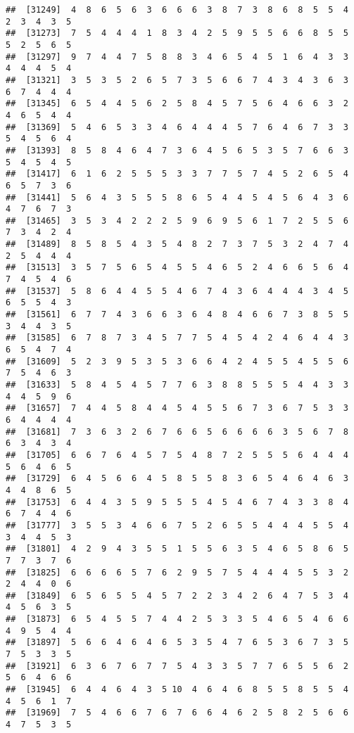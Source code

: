 \documentclass[
]{book}
\begin{document}
\begin{verbatim}
##  [31249]  4  8  6  5  6  3  6  6  6  3  8  7  3  8  6  8  5  5  4  2  3  4  3  5
##  [31273]  7  5  4  4  4  1  8  3  4  2  5  9  5  5  6  6  8  5  5  5  2  5  6  5
##  [31297]  9  7  4  4  7  5  8  8  3  4  6  5  4  5  1  6  4  3  3  4  4  4  5  4
##  [31321]  3  5  3  5  2  6  5  7  3  5  6  6  7  4  3  4  3  6  3  6  7  4  4  4
##  [31345]  6  5  4  4  5  6  2  5  8  4  5  7  5  6  4  6  6  3  2  4  6  5  4  4
##  [31369]  5  4  6  5  3  3  4  6  4  4  4  5  7  6  4  6  7  3  3  5  4  5  6  4
##  [31393]  8  5  8  4  6  4  7  3  6  4  5  6  5  3  5  7  6  6  3  5  4  5  4  5
##  [31417]  6  1  6  2  5  5  5  3  3  7  7  5  7  4  5  2  6  5  4  6  5  7  3  6
##  [31441]  5  6  4  3  5  5  5  8  6  5  4  4  5  4  5  6  4  3  6  4  7  6  7  3
##  [31465]  3  5  3  4  2  2  2  5  9  6  9  5  6  1  7  2  5  5  6  7  3  4  2  4
##  [31489]  8  5  8  5  4  3  5  4  8  2  7  3  7  5  3  2  4  7  4  2  5  4  4  4
##  [31513]  3  5  7  5  6  5  4  5  5  4  6  5  2  4  6  6  5  6  4  7  4  5  4  6
##  [31537]  5  8  6  4  4  5  5  4  6  7  4  3  6  4  4  4  3  4  5  6  5  5  4  3
##  [31561]  6  7  7  4  3  6  6  3  6  4  8  4  6  6  7  3  8  5  5  3  4  4  3  5
##  [31585]  6  7  8  7  3  4  5  7  7  5  4  5  4  2  4  6  4  4  3  6  5  4  7  4
##  [31609]  5  2  3  9  5  3  5  3  6  6  4  2  4  5  5  4  5  5  6  7  5  4  6  3
##  [31633]  5  8  4  5  4  5  7  7  6  3  8  8  5  5  5  4  4  3  3  4  4  5  9  6
##  [31657]  7  4  4  5  8  4  4  5  4  5  5  6  7  3  6  7  5  3  3  6  4  4  4  4
##  [31681]  7  3  6  3  2  6  7  6  6  5  6  6  6  6  3  5  6  7  8  6  3  4  3  4
##  [31705]  6  6  7  6  4  5  7  5  4  8  7  2  5  5  5  6  4  4  4  5  6  4  6  5
##  [31729]  6  4  5  6  6  4  5  8  5  5  8  3  6  5  4  6  4  6  3  4  4  8  6  5
##  [31753]  6  4  4  3  5  9  5  5  5  4  5  4  6  7  4  3  3  8  4  6  7  4  4  6
##  [31777]  3  5  5  3  4  6  6  7  5  2  6  5  5  4  4  4  5  5  4  3  4  4  5  3
##  [31801]  4  2  9  4  3  5  5  1  5  5  6  3  5  4  6  5  8  6  5  7  7  3  7  6
##  [31825]  6  6  6  6  5  7  6  2  9  5  7  5  4  4  4  5  5  3  2  2  4  4  0  6
##  [31849]  6  5  6  5  5  4  5  7  2  2  3  4  2  6  4  7  5  3  4  4  5  6  3  5
##  [31873]  6  5  4  5  5  7  4  4  2  5  3  3  5  4  6  5  4  6  6  4  9  5  4  4
##  [31897]  5  6  6  4  6  4  6  5  3  5  4  7  6  5  3  6  7  3  5  7  5  3  3  5
##  [31921]  6  3  6  7  6  7  7  5  4  3  3  5  7  7  6  5  5  6  2  5  6  4  6  6
##  [31945]  6  4  4  6  4  3  5 10  4  6  4  6  8  5  5  8  5  5  4  4  5  6  1  7
##  [31969]  7  5  4  6  6  7  6  7  6  6  4  6  2  5  8  2  5  6  6  4  7  5  3  5

\end{verbatim}
\end{document}

